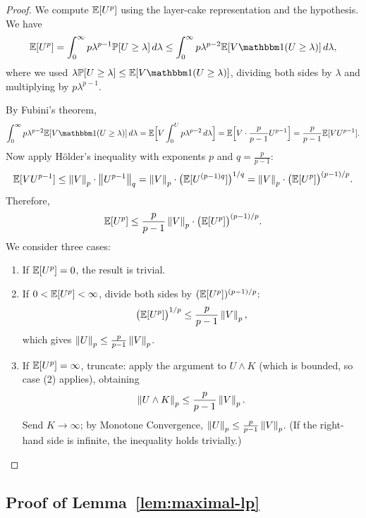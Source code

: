 \begin{proof}
    We compute $\mathbb{E}[U^p]$ using the layer-cake representation and the hypothesis. We have
    \[
        \E[U^p] = \int_0^\infty p \lambda^{p-1} \Prob[U \geq \lambda] \, d\lambda \leq \int_0^\infty p \lambda^{p-2} \E[V \ind(U \geq \lambda)] \, d\lambda,
    \]
    where we used $\lambda \Prob[U \geq \lambda] \leq \E[V \ind(U \geq \lambda)]$, dividing both sides by $\lambda$ and multiplying by $p\lambda^{p-1}$.

    By Fubini's theorem,
    \[
        \int_0^\infty p \lambda^{p-2} \E[V \ind(U \geq \lambda)] \, d\lambda = \E\Bigl[V \int_0^U p \lambda^{p-2} \, d\lambda\Bigr] = \E\Bigl[V \cdot \frac{p}{p-1} U^{p-1}\Bigr] = \frac{p}{p-1} \E[V U^{p-1}].
    \]
    Now apply H\"older's inequality with exponents $p$ and $q = \frac{p}{p-1}$:
    \[
        \mathbb{E}[V U^{p-1}] \leq \left\|V\right\|_p \cdot \left\|U^{p-1}\right\|_q = \left\|V\right\|_p \cdot \bigl(\mathbb{E}[U^{(p-1)q}]\bigr)^{1/q} = \left\|V\right\|_p \cdot \bigl(\mathbb{E}[U^p]\bigr)^{(p-1)/p}.
    \]
    Therefore,
    \[
        \mathbb{E}[U^p] \leq \frac{p}{p-1} \left\|V\right\|_p \cdot \bigl(\mathbb{E}[U^p]\bigr)^{(p-1)/p}.
    \]
    We consider three cases:
    \begin{enumerate}[label=(\arabic*)]
        \item If $\mathbb{E}[U^p] = 0$, the result is trivial.
        \item If $0 < \mathbb{E}[U^p] < \infty$, divide both sides by $(\mathbb{E}[U^p])^{(p-1)/p}$:
        \[
            \bigl(\mathbb{E}[U^p]\bigr)^{1/p} \leq \frac{p}{p-1} \left\|V\right\|_p,
        \]
        which gives $\left\|U\right\|_p \leq \frac{p}{p-1} \left\|V\right\|_p$.
        \item If $\mathbb{E}[U^p] = \infty$, truncate: apply the argument to $U \wedge K$ (which is bounded, so case (2) applies), obtaining
        \[
            \left\|U \wedge K\right\|_p \leq \frac{p}{p-1} \left\|V\right\|_p.
        \]
        Send $K \to \infty$; by Monotone Convergence, $\left\|U\right\|_p \leq \frac{p}{p-1} \left\|V\right\|_p$. (If the right-hand side is infinite, the inequality holds trivially.)
    \end{enumerate}
\end{proof}

\subsection{Proof of Lemma~\ref{lem:maximal-lp}}

